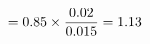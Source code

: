 \documentclass[preview]{standalone}
\begin{document}
\begin{align*}
\special{dvisvgm:raw <g id='unique000'>}= 0.85 \times \frac{0.02}{0.015} = 1.13\special{dvisvgm:raw </g>}
\end{align*}
\end{document}
